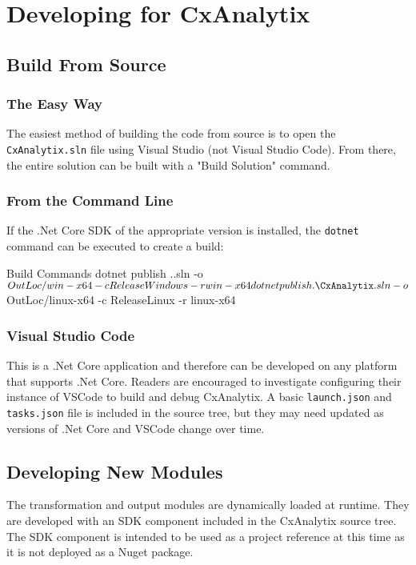\chapter{Developing for CxAnalytix}

\section{Build From Source}

\subsection{The Easy Way}
The easiest method of building the code from source is to open the \texttt{CxAnalytix.sln} file using Visual Studio (not Visual Studio Code).
From there, the entire solution can be built with a "Build Solution" command.

\subsection{From the Command Line}
If the .Net Core SDK of the appropriate version is installed, the \texttt{dotnet} command can be executed to create a build:\\

\begin{code}{Build Commands}{}{}
dotnet publish .\CxAnalytix.sln -o $OutLoc/win-x64 -c ReleaseWindows -r win-x64
dotnet publish .\CxAnalytix.sln -o $OutLoc/linux-x64 -c ReleaseLinux -r linux-x64
\end{code}

\subsection{Visual Studio Code}
This is a .Net Core application and therefore can be developed on any platform that supports .Net Core.  Readers are encouraged to investigate configuring
their instance of VSCode to build and debug CxAnalytix.  A basic \texttt{launch.json} and \texttt{tasks.json} file is included in the source tree, but they may need
updated as versions of .Net Core and VSCode change over time.


\section{Developing New Modules}

The transformation and output modules are dynamically loaded at runtime.  They are developed with an SDK component included in the CxAnalytix source tree.
The SDK component is intended to be used as a project reference at this time as it is not deployed as a Nuget package.

